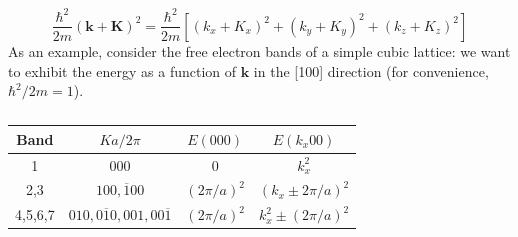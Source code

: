 \documentclass[10.75pt,a4paper,openright,bottom=2cm]{article}
\renewcommand{\Vec}[1]{\boldsymbol{#1}}
\begin{document}
\[
\frac{\hbar^2}{2m}(\Vec{k}+\Vec{K})^2=\frac{\hbar^2}{2m}[(k_x+K_x)^2+(k_y+K_y)^2+(k_z+K_z)^2]
\]
As an example, consider the free electron bands of a simple cubic lattice: we want to exhibit the energy as a function of $\Vec{k}$ in the [100] direction (for convenience, $\hbar^2/2m=1$).
\begin{table}[h!]
    \centering
    \begin{tabular}{cccc}
    \hline
    Band & $Ka/2\pi$ & $E(000)$ & $E(k_x00)$ \\
    \hline\hline
    1 & 000 & 0 & $k_x^2$ \\
    2,3 & $100,\overline{1}00$ & $(2\pi/a)^2$ & $(k_x\pm2\pi/a)^2$\\
    4,5,6,7 & $010, 0\overline{1}0, 001, 00\overline{1}$ & $(2\pi/a)^2$ & $k_x^2\pm(2\pi/a)^2$\\
    \hline
    \end{tabular}
    \caption*{}
    \label{tab:my_label}
\end{table}
\end{document}
